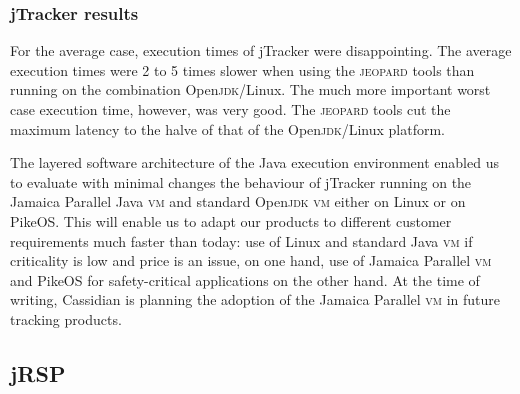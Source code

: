\documentclass{sig-alternate}
\newcommand{\acronym}[1]{\textsc{#1}}
\begin{document}


\subsubsection{jTracker results}
For the average case, execution times of jTracker were disappointing.
The average execution times were 2 to 5 times slower 
when using the \acronym{jeopard} tools than running on the combination Open\acronym{jdk}/Linux. 
The much more important worst case execution time, however, 
was very good. The \acronym{jeopard} tools 
cut the maximum latency to the halve of that of the Open\acronym{jdk}/Linux platform.

The layered software architecture of the Java execution environment 
enabled us to evaluate with minimal changes 
the behaviour of jTracker running on the Jamaica Parallel Java \acronym{vm} 
and standard Open\acronym{jdk} \acronym{vm} either on  Linux or on PikeOS. 
This will enable us to adapt our products 
to different customer requirements much faster than today: 
use of Linux and standard Java \acronym{vm} 
if criticality is low and price is an issue, on one hand, 
use of Jamaica Parallel \acronym{vm} and PikeOS 
for safety-critical applications on the other hand. 
At the time of writing, 
Cassidian is planning the adoption of the Jamaica Parallel \acronym{vm} 
in future tracking products.

\subsection{jRSP}
\end{document}
